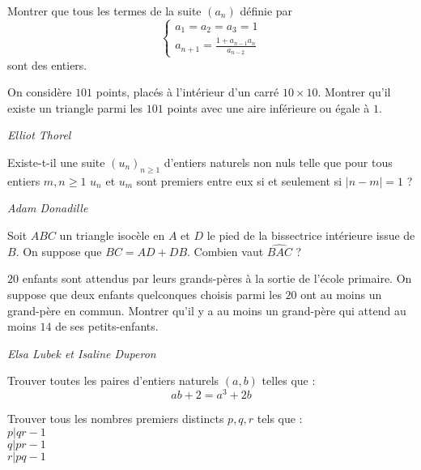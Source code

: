 \begin{exo}{}
Montrer que tous les termes de la suite $\left(a_{n}\right)$ définie par
\[\begin{cases}
a_{1}=a_{2}=a_{3}=1\\
a_{n+1}=\frac{1+a_{n-1}a_{n}}{a_{n-2}}
\end{cases}\]
sont des entiers.
\end{exo}

\begin{exo}{}
On considère $101$ points, placés à l'intérieur d'un carré $10\times10$. Montrer qu'il existe un triangle parmi les $101$ points avec une aire inférieure ou égale à $1$.

\medskip
\textit{Elliot Thorel}
\end{exo}

\begin{exo}{}
 Existe-t-il une
suite $\left(u_{n}\right)_{n \geq 1}$ d'entiers naturels non nuls telle que pour tous entiers $m,n \geq 1$
$u_{n}$ et $u_{m}$ sont premiers entre eux si et seulement si $\left|n-m\right|=1$
?

\medskip
\textit{Adam Donadille}
\end{exo}

\begin{exo}{}
Soit $ABC$ un triangle isocèle en $A$ et $D$ le pied de la bissectrice intérieure issue de $B$. On suppose que $BC=AD+DB$. Combien vaut $\widehat{BAC}$ ?
\end{exo}

\begin{exo}{}
$20$ enfants sont attendus par leurs grands-pères à la sortie de l’école primaire.
On suppose que deux enfants quelconques choisis parmi les $20$ ont au moins un grand-père en commun.
Montrer qu’il y a au moins un grand-père qui attend au moins $14$ de ses petits-enfants.

\medskip
\textit{Elsa Lubek et Isaline Duperon}
\end{exo}

\begin{exo}{}
Trouver toutes les paires d'entiers naturels $(a,b)$ telles que :
$$ab+2=a^3+2b$$
\end{exo}

\begin{exo}{}
Trouver tous les nombres premiers distincts $p,q,r$ tels que :\\
$ p|qr-1$\\
$ q|pr-1$\\
$ r|pq-1$\\
\end{exo}

